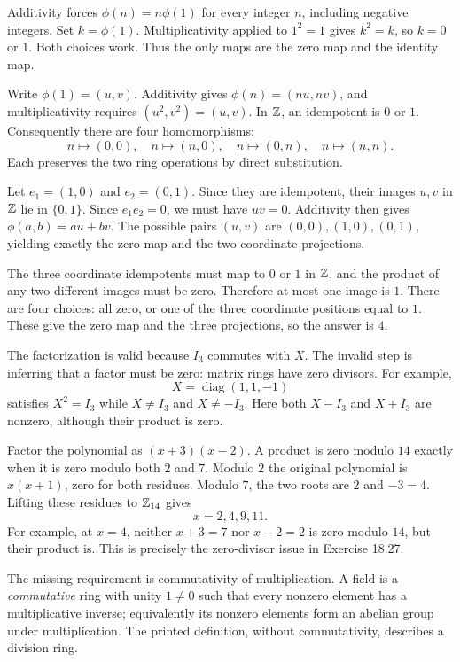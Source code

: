 Additivity forces $\phi(n)=n\phi(1)$ for every integer $n$, including negative integers. Set $k=\phi(1)$. Multiplicativity applied to $1^2=1$ gives $k^2=k$, so $k=0$ or $1$. Both choices work. Thus the only maps are the zero map and the identity map.

Write $\phi(1)=(u,v)$. Additivity gives $\phi(n)=(nu,nv)$, and multiplicativity requires $(u^2,v^2)=(u,v)$. In $\mathbb{Z}$, an idempotent is $0$ or $1$. Consequently there are four homomorphisms:
\[n\mapsto(0,0),\quad n\mapsto(n,0),\quad n\mapsto(0,n),\quad n\mapsto(n,n).
\]
Each preserves the two ring operations by direct substitution.

Let $e_1=(1,0)$ and $e_2=(0,1)$. Since they are idempotent, their images $u,v$ in $\mathbb{Z}$ lie in $\{0,1\}$. Since $e_1e_2=0$, we must have $uv=0$. Additivity then gives $\phi(a,b)=au+bv$. The possible pairs $(u,v)$ are $(0,0),(1,0),(0,1)$, yielding exactly the zero map and the two coordinate projections.

The three coordinate idempotents must map to $0$ or $1$ in $\mathbb{Z}$, and the product of any two different images must be zero. Therefore at most one image is $1$. There are four choices: all zero, or one of the three coordinate positions equal to $1$. These give the zero map and the three projections, so the answer is $\boxed{4}$.

The factorization is valid because $I_3$ commutes with $X$. The invalid step is inferring that a factor must be zero: matrix rings have zero divisors. For example,
\[X=\operatorname{diag}(1,1,-1)
\]
satisfies $X^2=I_3$ while $X\ne I_3$ and $X\ne-I_3$. Here both $X-I_3$ and $X+I_3$ are nonzero, although their product is zero.

Factor the polynomial as $(x+3)(x-2)$. A product is zero modulo $14$ exactly when it is zero modulo both $2$ and $7$. Modulo $2$ the original polynomial is $x(x+1)$, zero for both residues. Modulo $7$, the two roots are $2$ and $-3=4$. Lifting these residues to $\mathbb{Z}_{14}$ gives
\[\boxed{x=2,4,9,11}.
\]
For example, at $x=4$, neither $x+3=7$ nor $x-2=2$ is zero modulo $14$, but their product is. This is precisely the zero-divisor issue in Exercise 18.27.

The missing requirement is commutativity of multiplication. A field is a \emph{commutative} ring with unity $1\ne0$ such that every nonzero element has a multiplicative inverse; equivalently its nonzero elements form an abelian group under multiplication. The printed definition, without commutativity, describes a division ring.

